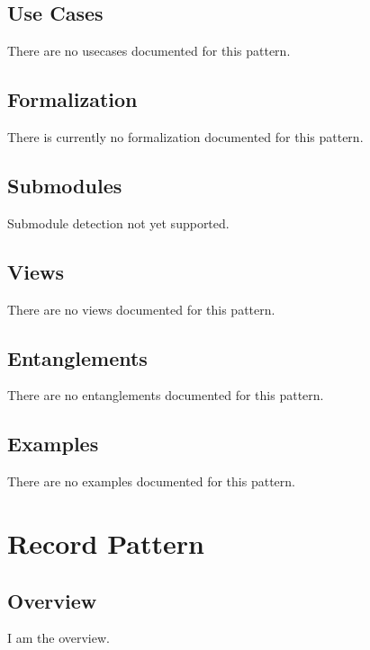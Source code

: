 \subsection{Use Cases}
\label{ssec:use-cases}
There are no usecases documented for this pattern.
\subsection{Formalization}
\label{ssec:formalization}
There is currently no formalization documented for this pattern.

\subsection{Submodules}
\label{ssec:submodules}
Submodule detection not yet supported.

\subsection{Views}
\label{ssec:views}
There are no views documented for this pattern.


\subsection{Entanglements}
\label{ssec:entanglements}
There are no entanglements documented for this pattern.

\subsection{Examples}
\label{ssec:examples}
There are no examples documented for this pattern.


\section{Record Pattern}
\label{sec:record-pattern}
\subsection{Overview}
\label{ssec:overview}
I am the overview.

